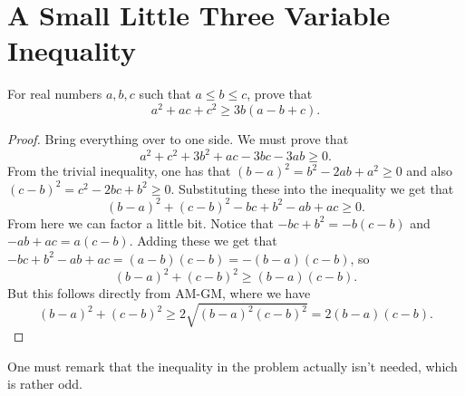 \documentclass[a4paper, 12pt]{article}
\begin{document}
\section*{A Small Little Three Variable Inequality}


\begin{chirpbox}
    \begin{problem}
        For real numbers \( a, b, c \) such that \( a \le b \le c \), prove that
        \[
            a^2 + ac + c^2 \ge 3b (a - b + c)
        .\]
    \end{problem}
\end{chirpbox}

\begin{proof}
Bring everything over to one side. We must prove that
\[
    a^2 + c^2 + 3b^2 + ac - 3bc - 3ab \ge 0
.\]
From the trivial inequality, one has that \( (b - a)^2 = b^2 - 2ab + a^2 \ge 0 \) and also \( (c - b)^2 = c^2 - 2bc + b^2 \ge 0 \). Substituting these into the inequality we get that
\[
    (b - a)^2 + (c - b)^2 - bc + b^2 - ab + ac \ge 0
.\]
From here we can factor a little bit. Notice that \( -bc + b^2 = - b(c - b) \) and \( -ab + ac = a(c - b) \). Adding these we get that \( -bc + b^2 - ab + ac = (a - b)(c - b) = -(b - a)(c - b) \), so
\[
    (b - a)^2 + (c-b)^2 \ge (b - a)(c - b)
.\]
But this follows directly from AM-GM, where we have
\[
    (b - a)^2 + (c - b)^2 \ge 2 \sqrt{(b - a)^2 (c - b)^2} = 2 (b-a)(c - b)
.\]
\end{proof}

One must remark that the inequality in the problem actually isn't needed, which
is rather odd.
\end{document}
